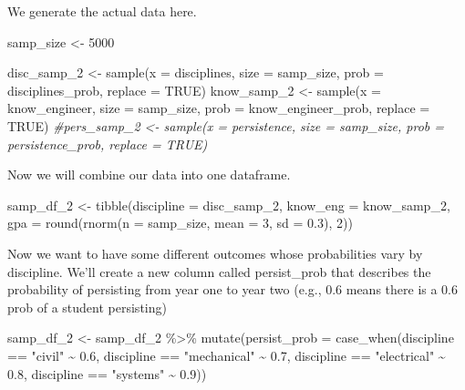 \documentclass[
]{book}
\newenvironment{Shaded}{\begin{snugshade}}{\end{snugshade}}
\newcommand{\AttributeTok}[1]{\textcolor[rgb]{0.77,0.63,0.00}{#1}}
\newcommand{\CommentTok}[1]{\textcolor[rgb]{0.56,0.35,0.01}{\textit{#1}}}
\newcommand{\ConstantTok}[1]{\textcolor[rgb]{0.00,0.00,0.00}{#1}}
\newcommand{\DecValTok}[1]{\textcolor[rgb]{0.00,0.00,0.81}{#1}}
\newcommand{\FloatTok}[1]{\textcolor[rgb]{0.00,0.00,0.81}{#1}}
\newcommand{\FunctionTok}[1]{\textcolor[rgb]{0.00,0.00,0.00}{#1}}
\newcommand{\NormalTok}[1]{#1}
\newcommand{\OtherTok}[1]{\textcolor[rgb]{0.56,0.35,0.01}{#1}}
\newcommand{\SpecialCharTok}[1]{\textcolor[rgb]{0.00,0.00,0.00}{#1}}
\newcommand{\StringTok}[1]{\textcolor[rgb]{0.31,0.60,0.02}{#1}}
\begin{document}
We generate the actual data here.

\begin{Shaded}
\begin{Highlighting}[]
\NormalTok{samp\_size }\OtherTok{\textless{}{-}} \DecValTok{5000}

\NormalTok{disc\_samp\_2 }\OtherTok{\textless{}{-}} \FunctionTok{sample}\NormalTok{(}\AttributeTok{x =}\NormalTok{ disciplines, }\AttributeTok{size =}\NormalTok{ samp\_size, }\AttributeTok{prob =}\NormalTok{ disciplines\_prob, }\AttributeTok{replace =} \ConstantTok{TRUE}\NormalTok{)}
\NormalTok{know\_samp\_2 }\OtherTok{\textless{}{-}} \FunctionTok{sample}\NormalTok{(}\AttributeTok{x =}\NormalTok{ know\_engineer, }\AttributeTok{size =}\NormalTok{ samp\_size, }\AttributeTok{prob =}\NormalTok{ know\_engineer\_prob, }\AttributeTok{replace =} \ConstantTok{TRUE}\NormalTok{)}
\CommentTok{\#pers\_samp\_2 \textless{}{-} sample(x = persistence, size = samp\_size, prob = persistence\_prob, replace = TRUE)}
\end{Highlighting}
\end{Shaded}

Now we will combine our data into one dataframe.

\begin{Shaded}
\begin{Highlighting}[]
\NormalTok{samp\_df\_2 }\OtherTok{\textless{}{-}} \FunctionTok{tibble}\NormalTok{(}\AttributeTok{discipline =}\NormalTok{ disc\_samp\_2,}
                  \AttributeTok{know\_eng =}\NormalTok{ know\_samp\_2,}
                  \AttributeTok{gpa =} \FunctionTok{round}\NormalTok{(}\FunctionTok{rnorm}\NormalTok{(}\AttributeTok{n =}\NormalTok{ samp\_size, }\AttributeTok{mean =} \DecValTok{3}\NormalTok{, }\AttributeTok{sd =} \FloatTok{0.3}\NormalTok{), }\DecValTok{2}\NormalTok{))}
\end{Highlighting}
\end{Shaded}

Now we want to have some different outcomes whose probabilities vary by discipline. We'll create a new column called persist\_prob that describes the probability of persisting from year one to year two (e.g., 0.6 means there is a 0.6 prob of a student persisting)

\begin{Shaded}
\begin{Highlighting}[]
\NormalTok{samp\_df\_2 }\OtherTok{\textless{}{-}}\NormalTok{ samp\_df\_2 }\SpecialCharTok{\%\textgreater{}\%} 
  \FunctionTok{mutate}\NormalTok{(}\AttributeTok{persist\_prob =} \FunctionTok{case\_when}\NormalTok{(discipline }\SpecialCharTok{==} \StringTok{"civil"} \SpecialCharTok{\textasciitilde{}} \FloatTok{0.6}\NormalTok{,}
\NormalTok{                             discipline }\SpecialCharTok{==} \StringTok{"mechanical"} \SpecialCharTok{\textasciitilde{}} \FloatTok{0.7}\NormalTok{,}
\NormalTok{                             discipline }\SpecialCharTok{==} \StringTok{"electrical"} \SpecialCharTok{\textasciitilde{}} \FloatTok{0.8}\NormalTok{,}
\NormalTok{                             discipline }\SpecialCharTok{==} \StringTok{"systems"} \SpecialCharTok{\textasciitilde{}} \FloatTok{0.9}\NormalTok{))}
\end{Highlighting}
\end{Shaded}
\end{document}

